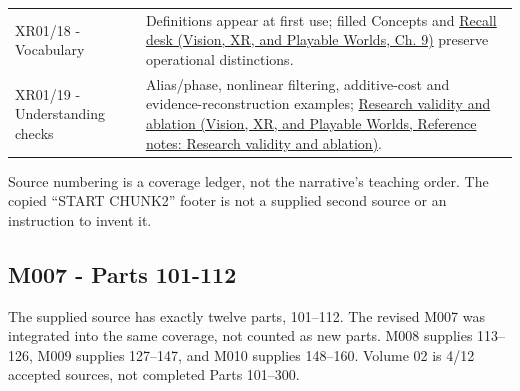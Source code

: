 {\begin{longtable}[]{@{}
  >{\raggedright\arraybackslash}p{}
  >{\raggedright\arraybackslash}p{}@{}}
XR01/18 - Vocabulary & Definitions appear at first use; filled Concepts and \href{../07-Vision-XR-and-Playable-Worlds/main.pdf\#nameddest=04-visual-computing-ii-ch042-teach-the-distinctions-from-a-blank-board}{Recall desk (Vision, XR, and Playable Worlds, Ch. 9)} preserve operational distinctions. \\
XR01/19 - Understanding checks & Alias/phase, nonlinear filtering, additive-cost and evidence-reconstruction examples; \href{../07-Vision-XR-and-Playable-Worlds/main.pdf\#nameddest=appendix-65788587ef78}{Research validity and ablation (Vision, XR, and Playable Worlds, Reference notes: Research validity and ablation)}. \\
\end{longtable}
}

Source numbering is a coverage ledger, not the narrative's teaching order. The copied ``START CHUNK2'' footer is not a supplied second source or an instruction to invent it.

\subsection{M007 - Parts 101-112}\label{appendix-fd090d982a15-m007---parts-101-112}

The supplied source has exactly twelve parts, 101--112. The revised M007 was integrated into the same coverage, not counted as new parts. M008 supplies 113--126, M009 supplies 127--147, and M010 supplies 148--160. Volume 02 is 4/12 accepted sources, not completed Parts 101--300.

